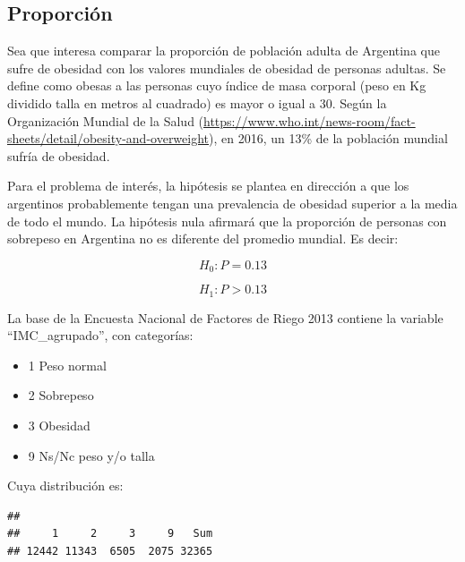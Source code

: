 \documentclass[]{book}
\newenvironment{Shaded}{\begin{snugshade}}{\end{snugshade}}
\newcommand{\DataTypeTok}[1]{\textcolor[rgb]{0.13,0.29,0.53}{#1}}
\newcommand{\KeywordTok}[1]{\textcolor[rgb]{0.13,0.29,0.53}{\textbf{#1}}}
\newcommand{\NormalTok}[1]{#1}
\newcommand{\OperatorTok}[1]{\textcolor[rgb]{0.81,0.36,0.00}{\textbf{#1}}}
\newcommand{\StringTok}[1]{\textcolor[rgb]{0.31,0.60,0.02}{#1}}
\providecommand{\tightlist}{%
  \setlength{\itemsep}{0pt}\setlength{\parskip}{0pt}}
\begin{document}
\hypertarget{proporciuxf3n}{%
\subsection{Proporción}\label{proporciuxf3n}}

Sea que interesa comparar la proporción de población adulta de Argentina que sufre de obesidad con los valores mundiales de obesidad de personas adultas. Se define como obesas a las personas cuyo índice de masa corporal (peso en Kg dividido talla en metros al cuadrado) es mayor o igual a 30. Según la Organización Mundial de la Salud (\url{https://www.who.int/news-room/fact-sheets/detail/obesity-and-overweight}), en 2016, un 13\% de la población mundial sufría de obesidad.

Para el problema de interés, la hipótesis se plantea en dirección a que los argentinos probablemente tengan una prevalencia de obesidad superior a la media de todo el mundo. La hipótesis nula afirmará que la proporción de personas con sobrepeso en Argentina no es diferente del promedio mundial. Es decir:

\[H_{0}:P = 0.13\]

\[H_{1}:P > 0.13\]

La base de la Encuesta Nacional de Factores de Riego 2013 contiene la variable ``IMC\_agrupado'', con categorías:

\begin{itemize}
\tightlist
\item
  1 Peso normal
\item
  2 Sobrepeso
\item
  3 Obesidad
\item
  9 Ns/Nc peso y/o talla
\end{itemize}

Cuya distribución es:

\begin{Shaded}
\end{Shaded}

\begin{verbatim}
## 
##     1     2     3     9   Sum 
## 12442 11343  6505  2075 32365
\end{verbatim}
\end{document}

